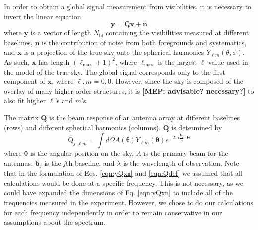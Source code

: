 \documentclass[twolcolumn,apj]{emulateapj}
\newcommand{\y}{\mathbf{y}}
\newcommand{\Q}{\mathbf{Q}}
\newcommand{\Nbl}{N_{\textrm{bl}}}
\newcommand{\acl}[1]{{\color{red} \textbf{[ACL:  #1]}}}
\newcommand{\mep}[1]{{\color{applegreen} \textbf{[MEP:  #1]}}}
\begin{document}
In order to obtain a global signal measurement from visibilities, it is necessary to invert the linear equation 
\begin{equation}
\y = \Q \mathbf{x} + \mathbf{n}
\label{eqn:yQxn}
\end{equation}
where $\y$ is a vector of length $\Nbl$ containing the visibilities measured at different baselines, $\mathbf{n}$ is the contribution of noise from both foregrounds and systematics, and $\mathbf{x}$ is a projection of the true sky onto the spherical harmonics $Y_{\ell m}(\theta,\phi)$. As such, $\mathbf{x}$ has length $(\ell_{\textrm{max}}+1)^2$, where $\ell_{\textrm{max}}$ is the largest $\ell$ value used in the model of the true sky. The global signal corresponds only to the first component of $\mathbf{x}$, where $\ell,m=0,0$. However, since the sky is composed of the overlay of many higher-order structures, it is \mep{advisable? necessary?} to also fit higher $\ell$'s and $m$'s. 

The matrix $\Q$ is the beam response of an antenna array at different baselines (rows) and different spherical harmonics (columns). $\Q$ is determined by 
\begin{equation}
\textrm{Q}_{j,\ell m} = \int d\Omega A(\boldsymbol \theta) Y_{\ell m}(\boldsymbol \theta) e^{-2\pi i \frac{\mathbf{b_\textit{j}}}{\lambda} \cdot \boldsymbol \theta}
\label{eqn:Qdef}
\end{equation}
where $\boldsymbol \theta$ is the angular position on the sky, $A$ is the primary beam for the antennas, $\mathbf{b_{\textit{j}}}$ is the $j$th baseline, and $\lambda$ is the wavelength of observation. Note that in the formulation of Eqs. \eqref{eqn:yQxn} and \eqref{eqn:Qdef} we assumed that all calculations would be done at a specific frequency. This is not necessary, as we could have expanded the dimensions of Eq. \eqref{eqn:yQxn} to include all of the frequencies measured in the experiment. However, we chose to do our calculations for each frequency independently in order to remain conservative in our assumptions about the spectrum.
\end{document}
